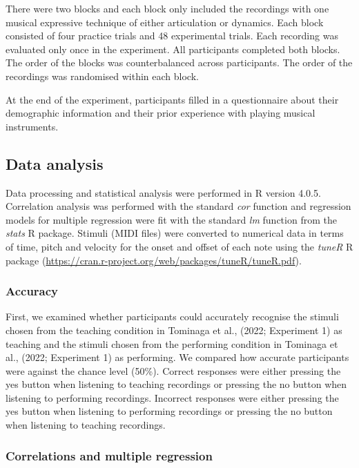 \documentclass[
  man,floatsintext]{apa6}
\begin{document}
There were two blocks and each block only included the recordings with one musical expressive technique of either articulation or dynamics. Each block consisted of four practice trials and 48 experimental trials. Each recording was evaluated only once in the experiment. All participants completed both blocks. The order of the blocks was counterbalanced across participants. The order of the recordings was randomised within each block.

At the end of the experiment, participants filled in a questionnaire about their demographic information and their prior experience with playing musical instruments.

\hypertarget{data-analysis}{%
\subsection{Data analysis}\label{data-analysis}}

Data processing and statistical analysis were performed in R version 4.0.5. Correlation analysis was performed with the standard \emph{cor} function and regression models for multiple regression were fit with the standard \emph{lm} function from the \emph{stats} R package. Stimuli (MIDI files) were converted to numerical data in terms of time, pitch and velocity for the onset and offset of each note using the \emph{tuneR} R package (\url{https://cran.r-project.org/web/packages/tuneR/tuneR.pdf}).

\hypertarget{accuracy}{%
\subsubsection{Accuracy}\label{accuracy}}

First, we examined whether participants could accurately recognise the stimuli chosen from the teaching condition in Tominaga et al., (2022; Experiment 1) as teaching and the stimuli chosen from the performing condition in Tominaga et al., (2022; Experiment 1) as performing. We compared how accurate participants were against the chance level (50\%). Correct responses were either pressing the yes button when listening to teaching recordings or pressing the no button when listening to performing recordings. Incorrect responses were either pressing the yes button when listening to performing recordings or pressing the no button when listening to teaching recordings.

\hypertarget{correlations-and-multiple-regression}{%
\subsubsection{Correlations and multiple regression}\label{correlations-and-multiple-regression}}
\end{document}
